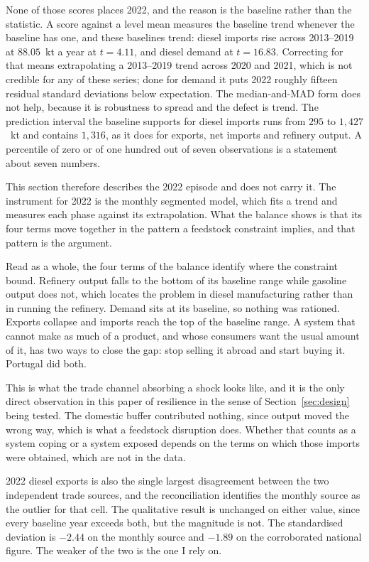 \documentclass[11pt,a4paper]{article}
\begin{document}
None of those scores places 2022, and the reason is the baseline rather than the statistic. A
score against a level mean measures the baseline trend whenever the baseline has one, and these
baselines trend: diesel imports rise across 2013--2019 at $88.05$~kt a year at $t=4.11$, and
diesel demand at $t=16.83$. Correcting for that means extrapolating a 2013--2019 trend across
2020 and 2021, which is not credible for any of these series; done for demand it puts 2022
roughly fifteen residual standard deviations below expectation. The median-and-MAD form does not
help, because it is robustness to spread and the defect is trend. The prediction interval the
baseline supports for diesel imports runs from $295$ to $1{,}427$~kt and contains $1{,}316$, as
it does for exports, net imports and refinery output. A percentile of zero or of one hundred out
of seven observations is a statement about seven numbers.

This section therefore describes the 2022 episode and does not carry it. The instrument for 2022
is the monthly segmented model, which fits a trend and measures each phase against its
extrapolation. What the balance shows is that its four terms move together in the pattern a
feedstock constraint implies, and that pattern is the argument.

Read as a whole, the four terms of the balance identify where the constraint bound. Refinery
output falls to the bottom of its baseline range while gasoline output does not, which locates
the problem in diesel manufacturing rather than in running the refinery. Demand sits at its
baseline, so nothing was rationed. Exports collapse and imports reach the top of the baseline
range. A system that cannot make as much of a product, and whose consumers want the usual amount
of it, has two ways to close the gap: stop selling it abroad and start buying it. Portugal did
both.

This is what the trade channel absorbing a shock looks like, and it is the only direct
observation in this paper of resilience in the sense of Section~\ref{sec:design} being tested.
The domestic buffer contributed nothing, since output moved the wrong way, which is what a
feedstock disruption does. Whether that counts as a system coping or a system exposed depends on
the terms on which those imports were obtained, which are not in the data.

2022 diesel exports is also the single largest disagreement between the two independent trade
sources, and the reconciliation identifies the monthly source as the outlier for that cell. The
qualitative result is unchanged on either value, since every baseline year exceeds both, but the
magnitude is not. The standardised deviation is $-2.44$ on the monthly source and $-1.89$ on the
corroborated national figure. The weaker of the two is the one I rely on.
\end{document}

